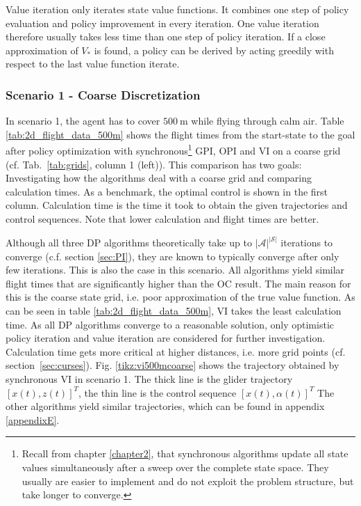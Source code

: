 Value iteration only iterates state value functions. It combines one step of policy evaluation and policy improvement in every iteration. One value iteration therefore usually takes less time than one step of policy iteration. If a close approximation of $V_*$ is found, a policy can be derived by acting greedily with respect to the last value function iterate.

\subsubsection{Scenario 1 - Coarse Discretization}

In scenario 1, the agent has to cover $500~\text{m}$ while flying through calm air. Table \ref{tab:2d_flight_data_500m} shows the flight times from the start-state to the goal after policy optimization with synchronous\footnote{Recall from chapter \ref{chapter2}, that synchronous algorithms update all state values simultaneously after a sweep over the complete state space. They usually are easier to implement and do not exploit the problem structure, but take longer to converge.} GPI, OPI and VI on a coarse grid (cf. Tab.~\ref{tab:grids}, column 1 (left)). This comparison has two goals: Investigating how the algorithms deal with a coarse grid and comparing calculation times. As a benchmark, the optimal control  is shown in the first column. Calculation time is the time it took to obtain the given trajectories and control sequences. Note that lower calculation and flight times are better.

Although all three DP algorithms theoretically take up to $|\mathcal{A}|^{|\mathcal{S}|}$ iterations to converge (c.f. section \ref{sec:PI}), they are known to typically converge after only few iterations. This is also the case in this scenario. All algorithms yield similar flight times that are significantly higher than the OC result. The main reason for this is the coarse state grid, i.e. poor approximation of the true value function. As can be seen in table \ref{tab:2d_flight_data_500m}, VI takes the least calculation time. As all DP algorithms converge to a reasonable solution, only optimistic policy iteration and value iteration are considered for further investigation. Calculation time gets more critical at higher distances, i.e. more grid points (cf. section~\ref{sec:curses}). Fig. \ref{tikz:vi500mcoarse} shows the trajectory obtained by synchronous VI in scenario 1. The thick line is the glider trajectory $[x(t),z(t)]^T$, the thin line is the control sequence $[x(t),\alpha(t)]^T$  The other algorithms yield similar trajectories, which can be found in appendix \ref{appendixE}.

